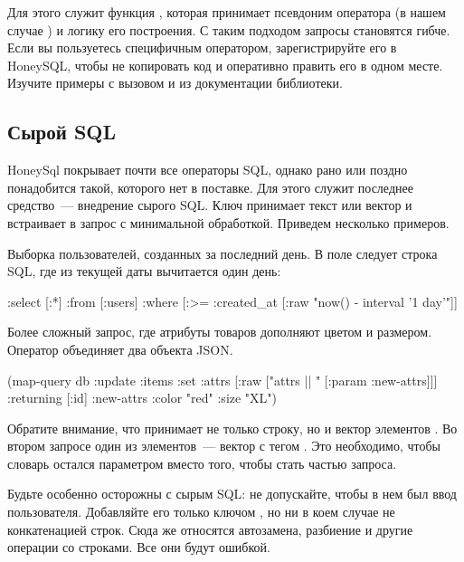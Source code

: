 Для этого служит функция , которая принимает псевдоним оператора (в нашем случае ) и логику его построения. С таким подходом запросы становятся гибче. Если вы пользуетесь специфичным оператором, зарегистрируйте его в HoneySQL, чтобы не копировать код и оперативно править его в одном месте. Изучите примеры с вызовом  и  из документации библиотеки.

\subsection{Сырой SQL}


HoneySql покрывает почти все операторы SQL, однако рано или поздно понадобится такой, которого нет в поставке. Для этого служит последнее средство~--- внедрение сырого SQL. Ключ  принимает текст или вектор и встраивает в запрос с минимальной обработкой. Приведем несколько примеров.

Выборка пользователей, созданных за последний день. В поле  следует строка SQL, где из текущей даты вычитается один день:

\begin{english}
  \begin{clojure/lines}
{:select [:*]
 :from [:users]
 :where [:>= :created_at
             [:raw "now() - interval '1 day'"]]}
  \end{clojure/lines}
\end{english}

Более сложный запрос, где атрибуты товаров дополняют цветом и размером. Оператор \code{||} объединяет два объекта JSON.

\begin{english}
  \begin{clojure}
(map-query
 db
 {:update :items
  :set {:attrs [:raw ["attrs || " [:param :new-attrs]]]}
  :returning [:id]}
 {:new-attrs {:color "red" :size "XL"}})
  \end{clojure}
\end{english}

Обратите внимание, что  принимает не только строку, но и вектор элементов . Во втором запросе один из элементов~--- вектор с тегом . Это необходимо, чтобы словарь  остался параметром вместо того, чтобы стать частью запроса.

Будьте особенно осторожны с сырым SQL: не допускайте, чтобы в нем был ввод пользователя. Добавляйте его только ключом , но ни в коем случае не конкатенацией строк. Сюда же относятся автозамена, разбиение и другие операции со строками. Все они будут ошибкой.

